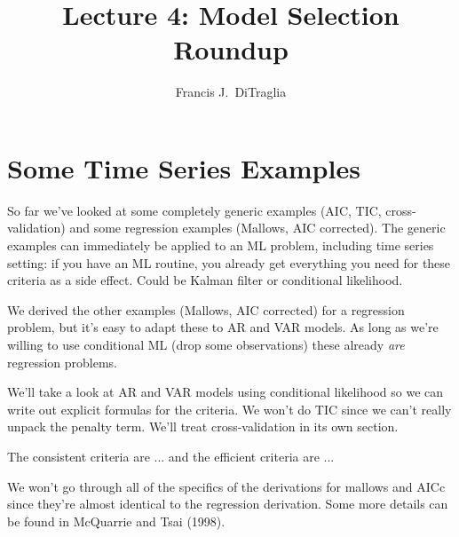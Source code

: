 \documentclass[12pt]{article}
\theoremstyle{definition}
\begin{document}
\title{Lecture 4: Model Selection Roundup}

\author{Francis J.\ DiTraglia}

\maketitle 


\section{Some Time Series Examples}

So far we've looked at some completely generic examples (AIC, TIC, cross-validation) and some regression examples (Mallows, AIC corrected). The generic examples can immediately be applied to an ML problem, including time series setting: if you have an ML routine, you already get everything you need for these criteria as a side effect. Could be Kalman filter or conditional likelihood.

We derived the other examples (Mallows, AIC corrected) for a regression problem, but it's easy to adapt these to AR and VAR models. As long as we're willing to use conditional ML (drop some observations) these already \emph{are} regression problems. 

We'll take a look at AR and VAR models using conditional likelihood so we can write out explicit formulas for the criteria. We won't do TIC since we can't really unpack the penalty term. We'll treat cross-validation in its own section. 

The consistent criteria are ... and the efficient criteria are ...


We won't go through all of the specifics of the derivations for mallows and AICc since they're almost identical to the regression derivation. Some more details can be found in McQuarrie and Tsai (1998).
\end{document}
